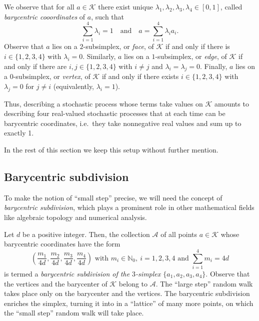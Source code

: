 \documentclass{amsart}
\newcommand{\N}{\mathbb{N}}
\newcommand{\cA}{\mathcal{A}}
\theoremstyle{definition}
\theoremstyle{remark}
\begin{document}
We observe that for all $a\in \mathscr{K}$ there exist unique $\lambda_1,\lambda_2,\lambda_3,\lambda_4\in[0,1]$, called \emph{barycentric cooordinates} of $a$, such that
\begin{equation*}
    \sum_{i=1}^{4}\lambda_i=1 \quad\text{and}\quad a=\sum_{i=1}^{4}\lambda_ia_i.
\end{equation*}
Observe that $a$ lies on a $2$-subsimplex, or \emph{face}, of $\mathscr{K}$ if and only if there is $i\in\{1,2,3,4\}$ with $\lambda_i=0$. Similarly, $a$ lies on a $1$-subsimplex, or \emph{edge}, of $\mathscr{K}$ if and only if there are $i,j\in\{1,2,3,4\}$ with $i\neq j $ and $\lambda_i=\lambda_j=0$. Finally, $a$ lies on a $0$-subsimplex, or \emph{vertex}, of $\mathscr{K}$ if and only if there exists $i\in\{1,2,3,4\}$ with $\lambda_j=0$ for $j\neq i$ (equivalently, $\lambda_i=1$).

Thus, describing a stochastic process whose terms take values on $\mathscr{K}$ amounts to describing four real-valued stochastic processes that at each time can be barycentric coordinates, i.e.~they take nonnegative real values and sum up to exactly 1.

In the rest of this section we keep this setup without further mention.

\subsection{Barycentric subdivision}

To make the notion of ``small step'' precise, we will need the concept of \emph{barycentric subdivision}, which plays a prominent role in other mathematical fields like algebraic topology and numerical analysis.

Let $d$ be a positive integer. Then, the collection $\cA$ of all points $a\in \mathscr{K}$ whose barycentric coordinates have the form
\begin{equation}
    \label{eq:barycentric_subdivision}
    \left(\frac{m_1}{4d},\frac{m_2}{4d},\frac{m_3}{4d},\frac{m_4}{4d}\right)\text{ with }m_i\in\N_{0},~i=1,2,3,4\text{ and }\sum_{i=1}^{4}m_i=4d
\end{equation}
is termed a \emph{barycentric subdivision of the $3$-simplex $\{a_1,a_2,a_3,a_4\}$}. Observe that the vertices and the barycenter of $\mathscr{K}$ belong to $\cA$. The ``large step'' random walk takes place only on the barycenter and the vertices. The barycentric subdivision enriches the simplex, turning it into in a ``lattice'' of many more points, on which the ``small step'' random walk will take place.
\end{document}
